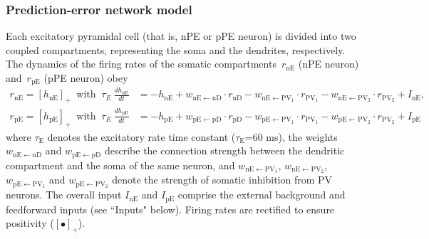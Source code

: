 \documentclass[10pt,a4paper]{article}
\begin{document}
\subsubsection{Prediction-error network model}
%
Each excitatory pyramidal cell (that is, nPE or pPE neuron) is divided into two coupled compartments, representing the soma and the dendrites, respectively. The dynamics of the firing rates of the somatic compartments~$r_{\mathrm{nE}}$ (nPE neuron) and~$r_{\mathrm{pE}}$ (pPE neuron) obey \citep{wilson1972excitatory}
%
\begin{align}
r_\mathrm{nE} = [h_\mathrm{nE}]_+ \ \mbox{ with }\ \tau_E\ \frac{dh_\mathrm{nE}}{dt} &= - h_\mathrm{nE} + w_\mathrm{nE\leftarrow nD}\cdot  r_\mathrm{nD}  -  w_\mathrm{nE\leftarrow PV_1}\cdot r_\mathrm{PV_1}  -  w_\mathrm{nE\leftarrow PV_2}\cdot r_\mathrm{PV_2} + I_\mathrm{nE}, \nonumber\\
r_\mathrm{pE} = [h_\mathrm{pE}]_+ \ \mbox{ with }\ \tau_E\ \frac{dh_\mathrm{pE}}{dt} &= - h_\mathrm{pE} + w_\mathrm{pE\leftarrow pD}\cdot  r_\mathrm{pD}  -  w_\mathrm{pE\leftarrow PV_1}\cdot r_\mathrm{PV_1}  -  w_\mathrm{pE\leftarrow PV_2}\cdot r_\mathrm{PV_2} + I_\mathrm{pE}
\end{align}
%
where $\tau_\mathrm{E}$ denotes the excitatory rate time constant ($\tau_\mathrm{E}$=60 ms), the weights $w_{\mathrm{nE\leftarrow nD}}$ and $w_{\mathrm{pE\leftarrow pD}}$ describe the connection strength between the dendritic compartment and the soma of the same neuron, and $w_{\mathrm{nE\leftarrow PV_1}}$, $w_{\mathrm{nE\leftarrow PV_2}}$, $w_{\mathrm{pE\leftarrow PV_1}}$ and $w_{\mathrm{pE\leftarrow PV_2}}$ denote the strength of somatic inhibition from PV neurons. The overall input $I_\mathrm{nE}$ and $I_\mathrm{pE}$ comprise the external background and feedforward inputs (see ``Inputs" below). Firing rates are rectified to ensure positivity ($[\bullet]_+$). 
\end{document}
